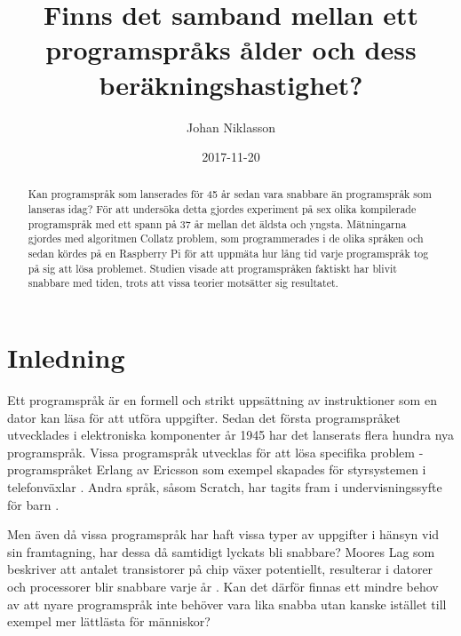 \documentclass[12pt,swedish]{article}
\title{Finns det samband mellan ett programspråks ålder och dess beräkningshastighet?}
\author{Johan Niklasson}
\date{2017-11-20}
\begin{document}

\maketitle
\normalsize
\begin{center}

\begin{abstract}
Kan programspråk som lanserades för 45 år sedan vara snabbare än programspråk som lanseras idag? För att undersöka detta gjordes experiment på sex olika kompilerade programspråk med ett spann på 37 år mellan det äldsta och yngsta. Mätningarna gjordes med algoritmen Collatz problem, som programmerades i de olika språken och sedan kördes på en Raspberry Pi för att uppmäta hur lång tid varje programspråk tog på sig att lösa problemet. Studien visade att programspråken faktiskt har blivit snabbare med tiden, trots att vissa teorier motsätter sig resultatet.
\end{abstract}
\end{center}
\clearpage


\tableofcontents
\clearpage


\section{Inledning}
Ett programspråk är en formell och strikt uppsättning av instruktioner som en dator kan läsa för att utföra uppgifter. Sedan det första programspråket utvecklades i elektroniska komponenter år 1945 \citep{bauer_wossner_1972} har det lanserats flera hundra nya programspråk. Vissa programspråk utvecklas för att lösa specifika problem - programspråket Erlang av Ericsson som exempel skapades för styrsystemen i telefonväxlar \citep{armstrong_1997}. Andra språk, såsom Scratch, har tagits fram i undervisningssyfte för barn \citep{maloney_resnick_rusk_silverman_eastmond_2010}.

Men även då vissa programspråk har haft vissa typer av uppgifter i hänsyn vid sin framtagning, har dessa då samtidigt lyckats bli snabbare? Moores Lag som beskriver att antalet transistorer på chip växer potentiellt, resulterar i datorer och processorer blir snabbare varje år \citep{schaller_1997}. Kan det därför finnas ett mindre behov av att nyare programspråk inte behöver vara lika snabba utan kanske istället till exempel mer lättlästa för människor?
\end{document}
